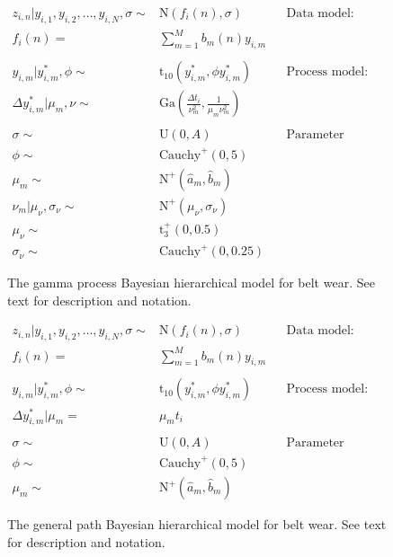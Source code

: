 \begin{figure}[t]
  \begin{subequations}
    \label{eq:full-gp-bw-model}
    \begin{align}
        z_{i, n}|y_{i, 1}, y_{i, 2}, \dots, y_{i, N}, \sigma \sim & \mbox{N}(f_i(n), \sigma) && \text{Data model: FDA} \\
        f_i(n)  = & \sum^{M}_{m = 1}b_m(n)y_{i, m} \\
        \nonumber \\
        y_{i, m}|y^*_{i, m}, \phi \sim & \mbox{t}_{10} (y^*_{i, m}, \phi y^*_{i, m}) && \text{Process model: Noisy GP} \\
        \Delta y^*_{i, m}|\mu_m, \nu \sim & \mbox{Ga} \left(\frac{\Delta t_i}{\nu_m^2},\frac{1}{\mu_m \nu_m^2}\right) \\
        \nonumber \\
        \sigma \sim & \mbox{U}(0, A) && \text{Parameter model: Priors} \\
        \phi \sim & \mbox{Cauchy}^{+}(0, 5) \\
        \mu_m \sim & \mbox{N}^{+}(\hat{a}_m, \hat{b}_m) \\
        \nu_m| \mu_\nu, \sigma_\nu \sim & \mbox{N}^{+}(\mu_\nu, \sigma_\nu) \\
        \mu_\nu \sim & \mbox{t}^{+}_{3}(0, 0.5) \\
        \sigma_\nu \sim & \mbox{Cauchy}^{+}(0, 0.25)
    \end{align}
  \end{subequations}
  
  \caption{The gamma process Bayesian hierarchical model for belt wear. See text for description and notation.}
  \label{fig:bhm-gp-belt-wear}
\end{figure}
  
\begin{figure}[t]
  \begin{subequations}
    \label{eq:full-lm-bw-model}
    \begin{align}
        z_{i, n}|y_{i, 1}, y_{i, 2}, \dots, y_{i, N}, \sigma \sim & \mbox{N}(f_i(n), \sigma) && \text{Data model: FDA} \\
        f_i(n)  = & \sum^{M}_{m = 1}b_m(n)y_{i, m} \\
        \nonumber \\
        y_{i, m}|y^*_{i, m}, \phi \sim & \mbox{t}_{10} (y^*_{i, m}, \phi y^*_{i, m}) && \text{Process model: Noisy GP} \\
        \Delta y^*_{i, m}|\mu_m = & \mu_m t_i \\
        \nonumber \\
        \sigma \sim & \mbox{U}(0, A) && \text{Parameter model: Priors} \\
        \phi \sim & \mbox{Cauchy}^{+}(0, 5) \\
        \mu_m \sim & \mbox{N}^{+}(\hat{a}_m, \hat{b}_m)
    \end{align}
  \end{subequations}
  
  \caption{The general path Bayesian hierarchical model for belt wear. See text for description and notation.}
  \label{fig:bhm-lm-belt-wear}
\end{figure}
    

